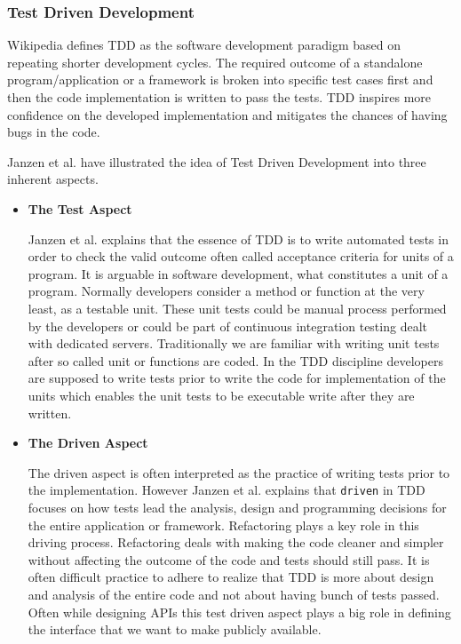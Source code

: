 \subsubsection{Test Driven Development}
Wikipedia \cite{wikitdd} defines TDD as the software development paradigm based on repeating shorter development cycles. The required outcome of a standalone program/application or a framework is broken into specific test cases first and then the code implementation is written to pass the tests. TDD inspires more confidence on the developed implementation and mitigates the chances of having bugs in the code.
\par Janzen et al. \cite{janzen2005test} have illustrated the idea of Test Driven Development into three inherent aspects.
\begin{itemize}
	\item \textbf{The Test Aspect}
	\par Janzen et al. \cite{janzen2005test} explains that the essence of TDD is to write automated tests in order to check the valid outcome often called acceptance criteria for units of a program. It is arguable in software development, what constitutes a unit of a program. Normally developers consider a method or function at the very least, as a testable unit. These unit tests could be manual process performed by the developers or could be part of continuous integration testing dealt with dedicated servers. Traditionally we are familiar with writing unit tests after so called unit or functions are coded. In the TDD discipline developers are supposed to write tests prior to write the code for implementation of the units which enables the unit tests to be executable write after they are written.
	\item \textbf{The Driven Aspect}
	\par The driven aspect is often interpreted as the practice of writing tests prior to the implementation. However Janzen et al. \cite{janzen2005test}  explains that \texttt{driven} in TDD focuses on how tests lead the analysis, design and programming decisions for the entire application or framework. Refactoring plays a key role in this driving process. Refactoring deals with making the code cleaner and simpler without affecting the outcome of the code and tests should still pass. It is often difficult practice to adhere to realize that TDD is more about design and analysis of the entire code and not about having bunch of tests passed. Often while designing APIs this test driven aspect plays a big role in defining the interface that we want to make publicly available.

\end{itemize}

